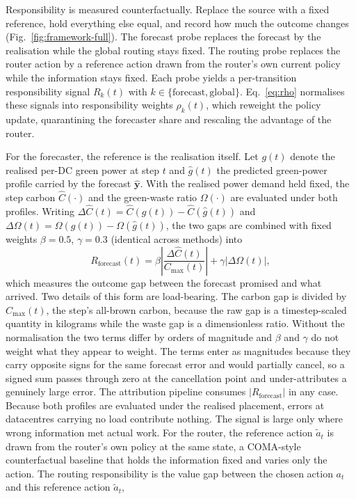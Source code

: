 \documentclass{article} %
\begin{document}
Responsibility is measured counterfactually. Replace the source with a fixed reference, hold everything else equal, and record how much the outcome changes (Fig.~\ref{fig:framework-full}). The forecast probe replaces the forecast by the realisation while the global routing stays fixed. The routing probe replaces the router action by a reference action drawn from the router's own current policy while the information stays fixed. Each probe yields a per-transition responsibility signal $R_k(t)$ with $k\in\{\text{forecast},\text{global}\}$. Eq.~\ref{eq:rho} normalises these signals into responsibility weights $\rho_k(t)$, which reweight the policy update, quarantining the forecaster share and rescaling the advantage of the router.

For the forecaster, the reference is the realisation itself. Let $g(t)$ denote the realised per-DC green power at step $t$ and $\hat{g}(t)$ the predicted green-power profile carried by the forecast $\hat{\mathbf{y}}$. With the realised power demand held fixed, the step carbon $\hat{C}(\cdot)$ and the green-waste ratio $\Omega(\cdot)$ are evaluated under both profiles. Writing $\Delta\hat{C}(t)=\hat{C}(g(t))-\hat{C}(\hat{g}(t))$ and $\Delta\Omega(t)=\Omega(g(t))-\Omega(\hat{g}(t))$, the two gaps are combined with fixed weights $\beta{=}0.5$, $\gamma{=}0.3$ (identical across methods) into
\begin{equation}
R_{\text{forecast}}(t)=\beta\left|\frac{\Delta\hat{C}(t)}{C_{\max}(t)}\right|
+\gamma\big|\Delta\Omega(t)\big|,
\label{eq:rfcst}
\end{equation}
which measures the outcome gap between the forecast promised and what arrived. Two details of this form are load-bearing. The carbon gap is divided by $C_{\max}(t)$, the step's all-brown carbon, because the raw gap is a timestep-scaled quantity in kilograms while the waste gap is a dimensionless ratio. Without the normalisation the two terms differ by orders of magnitude and $\beta$ and $\gamma$ do not weight what they appear to weight. The terms enter as magnitudes because they carry opposite signs for the same forecast error and would partially cancel, so a signed sum passes through zero at the cancellation point and under-attributes a genuinely large error. The attribution pipeline consumes $|R_{\text{forecast}}|$ in any case. Because both profiles are evaluated under the realised placement, errors at datacentres carrying no load contribute nothing. The signal is large only where wrong information met actual work. For the router, the reference action $\tilde{a}_t$ is drawn from the router's own policy at the same state, a COMA-style counterfactual baseline that holds the information fixed and varies only the action. The routing responsibility is the value gap between the chosen action $a_t$ and this reference action $\tilde{a}_t$,
\end{document}
